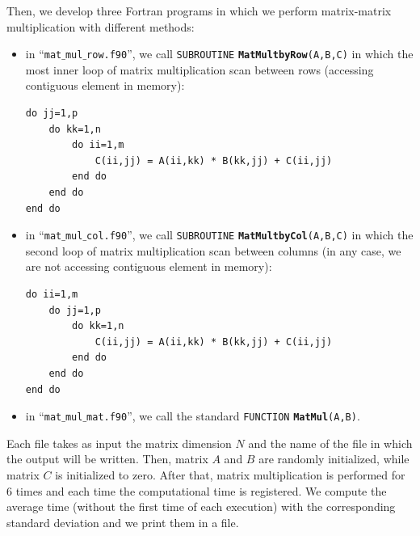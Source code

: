 \documentclass[rmp,10pt,onecolumn,fleqn,notitlepage]{revtex4-1}
\begin{document}
Then, we develop three Fortran programs in which we perform matrix-matrix multiplication with different methods:
\begin{itemize}
\item in “\texttt{mat$\_$mul$\_$row.f90}”, we call \texttt{SUBROUTINE} {\bfseries\texttt{MatMultbyRow}}\texttt{(A,B,C)} in which the most inner loop of matrix multiplication scan between rows (accessing contiguous element in memory):

\begin{minipage}[t]{0.53\linewidth}%
\begin{lstlisting}[style=Fortran]
do jj=1,p
    do kk=1,n
        do ii=1,m
            C(ii,jj) = A(ii,kk) * B(kk,jj) + C(ii,jj)
        end do
    end do
end do\end{lstlisting}
\end{minipage}

\item in “\texttt{mat$\_$mul$\_$col.f90}”, we call \texttt{SUBROUTINE} {\bfseries\texttt{MatMultbyCol}}\texttt{(A,B,C)} in which the second loop of matrix multiplication scan between columns (in any case, we are not accessing contiguous element in memory):

\begin{minipage}[t]{0.53\linewidth}%
\begin{lstlisting}[style=Fortran]
do ii=1,m
    do jj=1,p
        do kk=1,n
            C(ii,jj) = A(ii,kk) * B(kk,jj) + C(ii,jj)
        end do
    end do
end do\end{lstlisting}
\end{minipage}

\item in “\texttt{mat$\_$mul$\_$mat.f90}”, we call the standard \texttt{FUNCTION} {\bfseries\texttt{MatMul}}\texttt{(A,B)}.

\end{itemize}

Each file takes as input the matrix dimension $N$ and the name of the file in which the output will be written. Then, matrix \( A \) and \( B \) are randomly initialized, while matrix \( C \) is initialized to zero. After that, matrix multiplication is performed for 6 times and each time the computational time is registered. We compute the average time (without the first time of each execution) with the corresponding standard deviation and we print them in a file.
\end{document}
